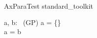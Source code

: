 \begin{zsection}
   \SECTION AxParaTest \parents standard\_toolkit
\end{zsection}


\begin{zed}
   [GP]
\end{zed}

\begin{axdef}
   a, b: \power~(\nat \cross GP)
\where
   \lnot a = \{\} \\
   a = b
\end{axdef}

